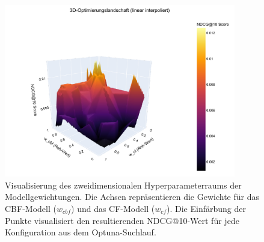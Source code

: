 
\begin{figure}[H]
    \centering
    \includegraphics[width=0.9\textwidth]{content/figures/svg/hyperparameterraum.pdf}
    \caption{Visualisierung des zweidimensionalen Hyperparameterraums der Modellgewichtungen. Die Achsen repräsentieren die Gewichte für das CBF-Modell (\(w_{cbf}\)) und das CF-Modell (\(w_{cf}\)). Die Einfärbung der Punkte visualisiert den resultierenden NDCG@10-Wert für jede Konfiguration aus dem Optuna-Suchlauf.}
    \label{fig:hyperparameterraum}
\end{figure}